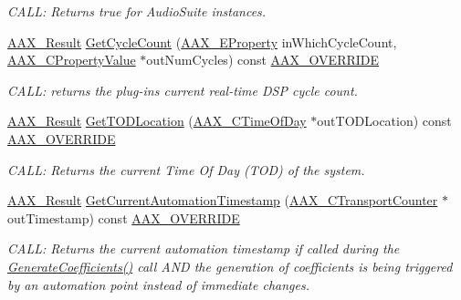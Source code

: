 \begin{DoxyCompactItemize}
\begin{DoxyCompactList}\small\item\em C\+A\+LL\+: Returns true for Audio\+Suite instances. \end{DoxyCompactList}\item 
\mbox{\hyperlink{a00392_a4d8f69a697df7f70c3a8e9b8ee130d2f}{A\+A\+X\+\_\+\+Result}} \mbox{\hyperlink{a01905_aa3a0f0060f70e8167634daf6beadeae5}{Get\+Cycle\+Count}} (\mbox{\hyperlink{a00662_a13e384f22825afd3db6d68395b79ce0d}{A\+A\+X\+\_\+\+E\+Property}} in\+Which\+Cycle\+Count, \mbox{\hyperlink{a00392_ab247c0d8686c14e05cbb567ef276f249}{A\+A\+X\+\_\+\+C\+Property\+Value}} $\ast$out\+Num\+Cycles) const \mbox{\hyperlink{a00392_ac2f24a5172689ae684344abdcce55463}{A\+A\+X\+\_\+\+O\+V\+E\+R\+R\+I\+DE}}
\begin{DoxyCompactList}\small\item\em C\+A\+LL\+: returns the plug-\/in\textquotesingle{}s current real-\/time D\+SP cycle count. \end{DoxyCompactList}\item 
\mbox{\hyperlink{a00392_a4d8f69a697df7f70c3a8e9b8ee130d2f}{A\+A\+X\+\_\+\+Result}} \mbox{\hyperlink{a01905_a9ae44bc7589edb872e8194099b575afd}{Get\+T\+O\+D\+Location}} (\mbox{\hyperlink{a00392_a46542a1dcccdcc3b4260a9926edf8a2a}{A\+A\+X\+\_\+\+C\+Time\+Of\+Day}} $\ast$out\+T\+O\+D\+Location) const \mbox{\hyperlink{a00392_ac2f24a5172689ae684344abdcce55463}{A\+A\+X\+\_\+\+O\+V\+E\+R\+R\+I\+DE}}
\begin{DoxyCompactList}\small\item\em C\+A\+LL\+: Returns the current Time Of Day (T\+OD) of the system. \end{DoxyCompactList}\item 
\mbox{\hyperlink{a00392_a4d8f69a697df7f70c3a8e9b8ee130d2f}{A\+A\+X\+\_\+\+Result}} \mbox{\hyperlink{a01905_affb116c9d90b03aa974ad238d4690e22}{Get\+Current\+Automation\+Timestamp}} (\mbox{\hyperlink{a00392_ac09cd6857748cc296ac0f8bcc20dc74b}{A\+A\+X\+\_\+\+C\+Transport\+Counter}} $\ast$out\+Timestamp) const \mbox{\hyperlink{a00392_ac2f24a5172689ae684344abdcce55463}{A\+A\+X\+\_\+\+O\+V\+E\+R\+R\+I\+DE}}
\begin{DoxyCompactList}\small\item\em C\+A\+LL\+: Returns the current automation timestamp if called during the \mbox{\hyperlink{a01669_a083265b008921b6114ede387711694b7}{Generate\+Coefficients()}} call A\+ND the generation of coefficients is being triggered by an automation point instead of immediate changes. \end{DoxyCompactList}\item 

\end{DoxyCompactItemize}
